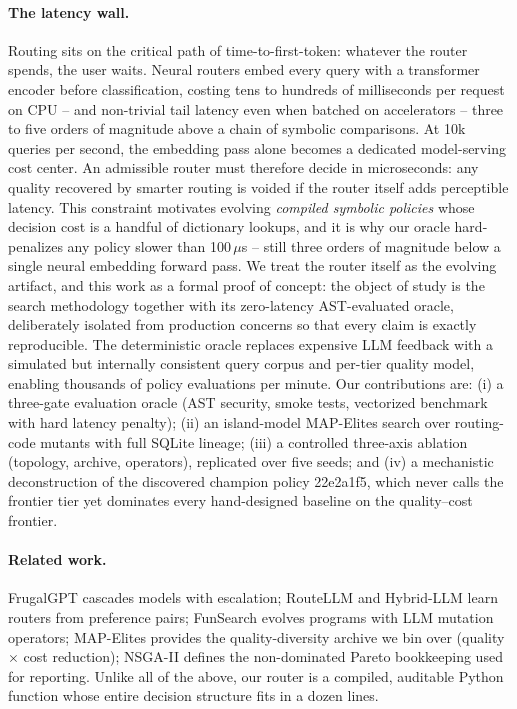 \documentclass[11pt]{article}
\begin{document}
\paragraph{The latency wall.} Routing sits on the critical path of time-to-first-token: whatever the router spends, the user waits. Neural routers embed every query with a transformer encoder before classification, costing tens to hundreds of milliseconds per request on CPU -- and non-trivial tail latency even when batched on accelerators -- three to five orders of magnitude above a chain of symbolic comparisons. At 10k queries per second, the embedding pass alone becomes a dedicated model-serving cost center. An admissible router must therefore decide in microseconds: any quality recovered by smarter routing is voided if the router itself adds perceptible latency. This constraint motivates evolving \emph{compiled symbolic policies} whose decision cost is a handful of dictionary lookups, and it is why our oracle hard-penalizes any policy slower than 100\,$\mu$s -- still three orders of magnitude below a single neural embedding forward pass.
We treat the router itself as the evolving artifact, and this work as a formal proof of concept: the object of study is the search methodology together with its zero-latency AST-evaluated oracle, deliberately isolated from production concerns so that every claim is exactly reproducible. The deterministic oracle replaces expensive LLM feedback with a simulated but internally consistent query corpus and per-tier quality model, enabling thousands of policy evaluations per minute. Our contributions are: (i) a three-gate evaluation oracle (AST security, smoke tests, vectorized benchmark with hard latency penalty); (ii) an island-model MAP-Elites search over routing-code mutants with full SQLite lineage; (iii) a controlled three-axis ablation (topology, archive, operators), replicated over five seeds; and (iv) a mechanistic deconstruction of the discovered champion policy 22e2a1f5, which never calls the frontier tier yet dominates every hand-designed baseline on the quality--cost frontier.
\paragraph{Related work.} FrugalGPT \cite{frugalgpt} cascades models with escalation; RouteLLM \cite{routellm} and Hybrid-LLM \cite{hybridllm} learn routers from preference pairs; FunSearch \cite{funsearch} evolves programs with LLM mutation operators; MAP-Elites \cite{mapelites} provides the quality-diversity archive we bin over (quality $\times$ cost reduction); NSGA-II \cite{nsgaii} defines the non-dominated Pareto bookkeeping used for reporting. Unlike all of the above, our router is a compiled, auditable Python function whose entire decision structure fits in a dozen lines.
\end{document}
